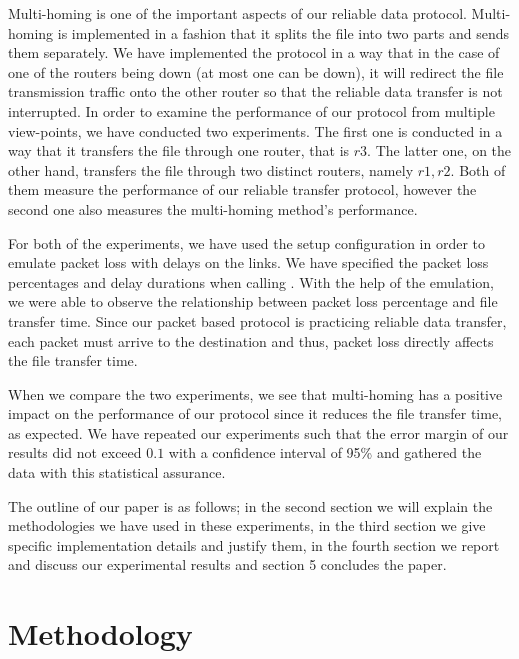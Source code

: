 \documentclass[conference]{IEEEtran}
\begin{document}
    Multi-homing is one of the important aspects of our reliable data protocol. Multi-homing is implemented in a fashion that it splits the file into two parts and sends them separately. We have implemented the protocol in a way that in the case of one of the routers being down (at most one can be down), it will redirect the file transmission traffic onto the other  router so that the reliable data transfer is not interrupted. In order to examine the performance of our protocol from multiple view-points, we have conducted two experiments. The first one is conducted in a way that it transfers the file through one router, that is $r3$. The latter one, on the other hand, transfers the file through two distinct routers, namely $r1,r2$. Both of them measure the performance of our reliable transfer protocol, however the second one also measures the multi-homing method's performance.
    
    For both of the experiments, we have used the  setup configuration in order to emulate packet loss with delays on the links. We have specified the packet loss percentages and delay durations when calling . With the help of the emulation, we were able to observe the relationship between packet loss percentage and file transfer time. Since our packet based protocol is practicing reliable data transfer, each packet must arrive to the destination and thus, packet loss directly affects the file transfer time.
    
    When we compare the two experiments, we see that multi-homing has a positive impact on the performance of our protocol since it reduces the file transfer time, as expected. We have repeated our experiments such that the error margin of our results did not exceed $0.1$ with a confidence interval of 95\% and gathered the data with this statistical assurance.
    
    The outline of our paper is as follows; in the second section we will explain the methodologies we have used in these experiments, in the third section we give specific implementation details and justify them, in the fourth section we report and discuss our experimental results and section 5 concludes the paper.
    


\section{Methodology}
\end{document}
